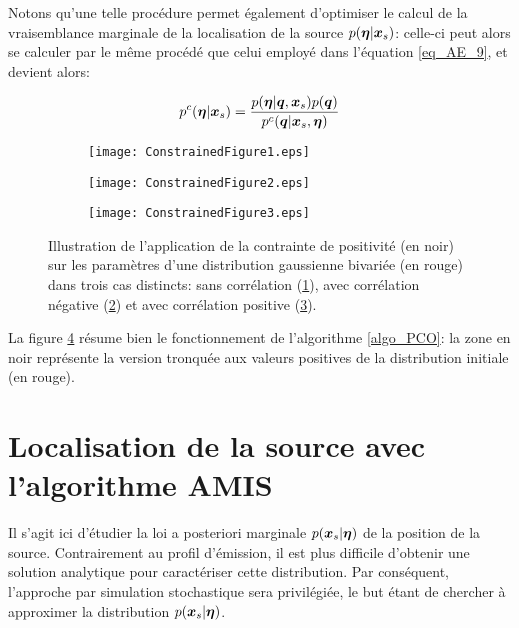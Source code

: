 Notons qu'une telle procédure permet également d'optimiser le calcul de la vraisemblance marginale de la localisation de la source $p({\bm{\eta}} | {\bm{x}_s})$: celle-ci peut alors se calculer par le même procédé que celui employé dans l'équation \eqref{eq_AE_9}, et devient alors:

\begin{equation}
p^c({\bm{\eta}} | {\bm{x}_s}) = \dfrac{p({\bm{\eta}} | {\bm{q}}, {\bm{x}_s})p({\bm{q}})}{p^c({\bm{q}} | {\bm{x}_s}, {\bm{\eta}})}
\label{eq_AE_17}
\end{equation}


 \begin{figure}[h!]
 	\centering
 	\begin{subfigure}[t]{0.5\textwidth}
 		\centering
		\texttt{[image: ConstrainedFigure1.eps]}
		\caption{}
 		\label{fig_AE_2_a}
 	\end{subfigure}%
 	\begin{subfigure}[t]{0.5\textwidth}
 		\centering
		\texttt{[image: ConstrainedFigure2.eps]}
		\caption{}
 		\label{fig_AE_2_b}
 	\end{subfigure}
 	\begin{subfigure}[t]{0.5\textwidth}
 		\centering
 		\texttt{[image: ConstrainedFigure3.eps]}
 		\caption{}
 		\label{fig_AE_2_c}
 	\end{subfigure} 

 	\caption{Illustration de l'application de la contrainte de positivité (en noir) sur les paramètres d'une distribution gaussienne bivariée (en rouge) dans trois cas distincts: sans corrélation (\ref{fig_AE_2_a}), avec corrélation négative (\ref{fig_AE_2_b}) et avec corrélation positive (\ref{fig_AE_2_c}).}
 	 \label{fig_AE_2}	
 \end{figure}

La figure \ref{fig_AE_2} résume bien le fonctionnement de l'algorithme \ref{algo_PCO}: la zone en noir représente la version tronquée aux valeurs positives de la distribution initiale (en rouge). 

\section{Localisation de la source avec l'algorithme AMIS}

Il s'agit ici d'étudier la loi a posteriori marginale $p({\bm{x}_s} | {\bm{\eta}})$ de la position de la source. Contrairement au profil d'émission, il est plus difficile d'obtenir une solution analytique pour caractériser cette distribution. Par conséquent, l'approche par simulation stochastique sera privilégiée, le but étant de chercher à approximer la distribution $p({\bm{x}_s} | {\bm{\eta}})$. \\

